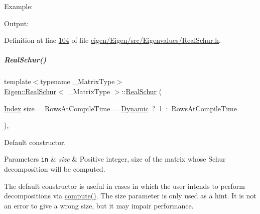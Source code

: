 Example\+: 
\begin{DoxyCodeInclude}
\end{DoxyCodeInclude}
 Output\+: 
\begin{DoxyVerbInclude}
\end{DoxyVerbInclude}
 

Definition at line \hyperlink{eigen_2_eigen_2src_2_eigenvalues_2_real_schur_8h_source_l00104}{104} of file \hyperlink{eigen_2_eigen_2src_2_eigenvalues_2_real_schur_8h_source}{eigen/\+Eigen/src/\+Eigenvalues/\+Real\+Schur.\+h}.

\mbox{\label{group___eigenvalues___module_a826c83e2f1d4c8332606a14ea121ff5f}} 
\subparagraph{\texorpdfstring{Real\+Schur()}{RealSchur()}\hspace{0.1cm}{\footnotesize\ttfamily [3/4]}}
{\footnotesize\ttfamily template$<$typename \+\_\+\+Matrix\+Type$>$ \\
\hyperlink{group___eigenvalues___module_class_eigen_1_1_real_schur}{Eigen\+::\+Real\+Schur}$<$ \+\_\+\+Matrix\+Type $>$\+::\hyperlink{group___eigenvalues___module_class_eigen_1_1_real_schur}{Real\+Schur} (\begin{DoxyParamCaption}\item[{\hyperlink{group___eigenvalues___module_a8bd4653e2d9569a44ecc95e746422d3f}{Index}}]{size = {\ttfamily RowsAtCompileTime==\hyperlink{namespace_eigen_ad81fa7195215a0ce30017dfac309f0b2}{Dynamic}~?~1~\+:~RowsAtCompileTime} }\end{DoxyParamCaption})\hspace{0.3cm}{\ttfamily [inline]}, {\ttfamily [explicit]}}



Default constructor. 


\begin{DoxyParams}[1]{Parameters}
\mbox{\tt in}  & {\em size} & Positive integer, size of the matrix whose Schur decomposition will be computed.\\
\hline
\end{DoxyParams}
The default constructor is useful in cases in which the user intends to perform decompositions via \hyperlink{group___eigenvalues___module_a60caf9ffad11d728ea458c4dd36d0a98}{compute()}. The {\ttfamily size} parameter is only used as a hint. It is not an error to give a wrong {\ttfamily size}, but it may impair performance.

